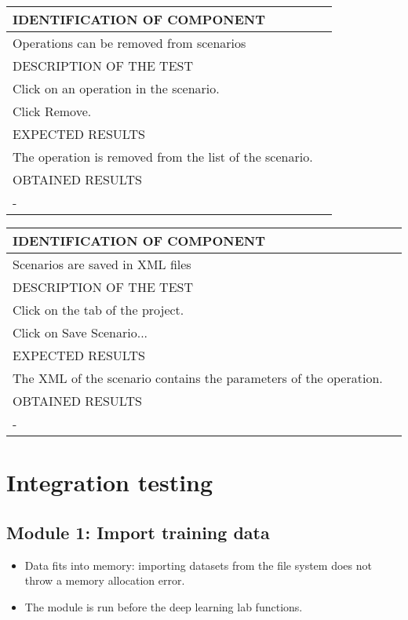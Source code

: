 \documentclass{polytech/polytech}
\numberwithin{figure}{chapter}
\begin{document}
\begin{appendix}
\begin{table}[]
\begin{tabular}{|l|l|}\hline
\color{C} IDENTIFICATION OF COMPONENT \\\hline
Operations can be removed from scenarios  \\\hline
\color{C} DESCRIPTION OF THE TEST\\\hline
Click on an operation in the scenario.\\ Click Remove. \\\hline
\color{C} EXPECTED RESULTS \\\hline
The operation is removed from the list of the scenario. \\\hline
\color{C} OBTAINED RESULTS \\\hline
- \\\hline
\end{tabular}
\end{table}

\begin{table}[]
\begin{tabular}{|l|l|}\hline
\color{C} IDENTIFICATION OF COMPONENT \\\hline
Scenarios are saved in XML files  \\\hline
\color{C} DESCRIPTION OF THE TEST\\\hline
Click on the tab of the project.\\ Click on Save Scenario... \\\hline
\color{C} EXPECTED RESULTS \\\hline
The XML of the scenario contains the parameters of the operation. \\\hline
\color{C} OBTAINED RESULTS \\\hline
- \\\hline
\end{tabular}
\end{table}

\section{Integration testing}

\subsection{Module 1: Import training data}

\begin{itemize}
\item Data fits into memory: importing datasets from the file system does not throw a memory allocation error.
\item The module is run before the deep learning lab functions.
\end{itemize}


\end{appendix}
\end{document}
